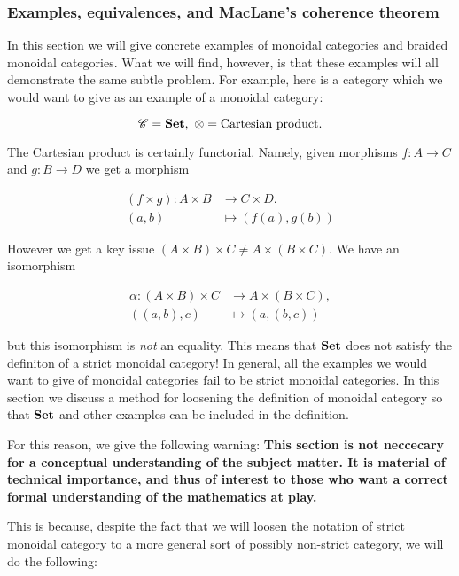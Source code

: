 \subsubsection{Examples, equivalences, and MacLane's coherence theorem}

In this section we will give concrete examples of monoidal categories and braided monoidal categories. What we will find, however, is that these examples will all demonstrate the same subtle problem. For example, here is a category which we would want to give as an example of a monoidal category:

$$\mathscr{C}=\mathbf{Set},\,\, \otimes = \text{Cartesian product}.$$

The Cartesian product is certainly functorial. Namely, given morphisms $f:A\to C$ and $g:B\to D$ we get a morphism

\begin{align*}
(f\times g): A\times B &\xrightarrow{} C\times D.\\
(a,b)&\mapsto (f(a), g(b))
\end{align*}

However we get a key issue $(A\times B)\times C \neq A\times (B\times C)$. We have an isomorphism

\begin{align*}
\alpha : (A\times B )\times C &\xrightarrow{} A \times (B\times C),\\
((a,b),c)&\mapsto (a,(b,c))
\end{align*}

but this isomorphism is \textit{not} an equality. This means that $\mathbf{Set}$ does not satisfy the definiton of a strict monoidal category! In general, all the examples we would want to give of monoidal categories fail to be strict monoidal categories. In this section we discuss a method for loosening the definition of monoidal category so that $\mathbf{Set}$ and other examples can be included in the definition.

For this reason, we give the following warning: \textbf{This section is not neccecary for a conceptual understanding of the subject matter. It is material of technical importance, and thus of interest to those who want a correct formal understanding of the mathematics at play.}

This is because, despite the fact that we will loosen the notation of strict monoidal category to a more general sort of possibly non-strict category, we will do the following:

\begin{center}
\end{center}

